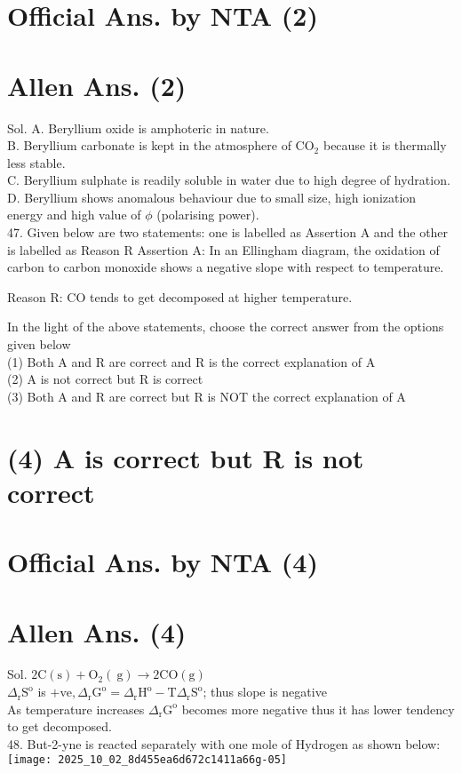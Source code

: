 \documentclass[10pt]{article}
\begin{document}
\section*{Official Ans. by NTA (2)}
\section*{Allen Ans. (2)}
Sol. A. Beryllium oxide is amphoteric in nature.\\
B. Beryllium carbonate is kept in the atmosphere of \(\mathrm{CO}_{2}\) because it is thermally less stable.\\
C. Beryllium sulphate is readily soluble in water due to high degree of hydration.\\
D. Beryllium shows anomalous behaviour due to small size, high ionization energy and high value of \(\phi\) (polarising power).\\
47. Given below are two statements: one is labelled as Assertion A and the other is labelled as Reason R Assertion A: In an Ellingham diagram, the oxidation of carbon to carbon monoxide shows a negative slope with respect to temperature.

Reason R: CO tends to get decomposed at higher temperature.

In the light of the above statements, choose the correct answer from the options given below\\
(1) Both A and R are correct and R is the correct explanation of A\\
(2) A is not correct but R is correct\\
(3) Both A and R are correct but R is NOT the correct explanation of A

\section*{(4) A is correct but R is not correct}
\section*{Official Ans. by NTA (4)}
\section*{Allen Ans. (4)}
Sol. \(2 \mathrm{C}(\mathrm{s})+\mathrm{O}_{2}(\mathrm{~g}) \rightarrow 2 \mathrm{CO}(\mathrm{g})\)\\
\(\Delta_{\mathrm{r}} \mathrm{S}^{\mathrm{o}}\) is \(+\mathrm{ve}, \Delta_{\mathrm{r}} \mathrm{G}^{\mathrm{o}}=\Delta_{\mathrm{r}} \mathrm{H}^{\mathrm{o}}-\mathrm{T} \Delta_{\mathrm{r}} \mathrm{S}^{\mathrm{o}}\); thus slope is negative\\
As temperature increases \(\Delta_{\mathrm{r}} \mathrm{G}^{\mathrm{o}}\) becomes more negative thus it has lower tendency to get decomposed.\\
48. But-2-yne is reacted separately with one mole of Hydrogen as shown below:\\
\texttt{[image: 2025\_10\_02\_8d455ea6d672c1411a66g-05]}
\end{document}
